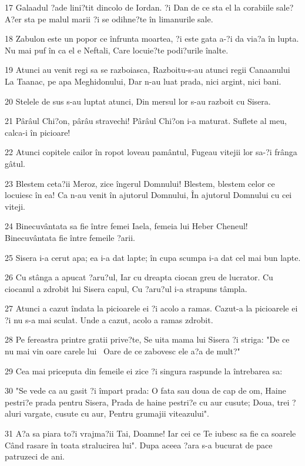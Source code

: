 \par 17 Galaadul ?ade lini?tit dincolo de Iordan. ?i Dan de ce sta el la corabiile sale? A?er sta pe malul marii ?i se odihne?te în limanurile sale.
\par 18 Zabulon este un popor ce înfrunta moartea, ?i este gata a-?i da via?a în lupta. Nu mai puf în ca el e Neftali, Care locuie?te podi?urile înalte.
\par 19 Atunci au venit regi sa se razboiasca, Razboitu-s-au atunci regii Canaanului La Taanac, pe apa Meghidonului, Dar n-au luat prada, nici argint, nici bani.
\par 20 Stelele de sus s-au luptat atunci, Din mersul lor s-au razboit cu Sisera.
\par 21 Pârâul Chi?on, pârâu stravechi! Pârâul Chi?on i-a maturat. Suflete al meu, calca-i în picioare!
\par 22 Atunci copitele cailor în ropot loveau pamântul, Fugeau vitejii lor sa-?i frânga gâtul.
\par 23 Blestem ceta?ii Meroz, zice îngerul Domnului! Blestem, blestem celor ce locuiesc în ea! Ca n-au venit în ajutorul Domnului, În ajutorul Domnului cu cei viteji.
\par 24 Binecuvântata sa fie între femei Iaela, femeia lui Heber Cheneul! Binecuvântata fie între femeile ?arii.
\par 25 Sisera i-a cerut apa; ea i-a dat lapte; în cupa scumpa i-a dat cel mai bun lapte.
\par 26 Cu stânga a apucat ?aru?ul, Iar cu dreapta ciocan greu de lucrator. Cu ciocanul a zdrobit lui Sisera capul, Cu ?aru?ul i-a strapuns tâmpla.
\par 27 Atunci a cazut îndata la picioarele ei ?i acolo a ramas. Cazut-a la picioarele ei ?i nu s-a mai sculat. Unde a cazut, acolo a ramas zdrobit.
\par 28 Pe fereastra printre gratii prive?te, Se uita mama lui Sisera ?i striga: "De ce nu mai vin oare carele lui  Oare de ce zabovesc ele a?a de mult?"
\par 29 Cea mai priceputa din femeile ei zice ?i singura raspunde la întrebarea sa:
\par 30 "Se vede ca au gasit ?i împart prada: O fata sau doua de cap de om, Haine pestri?e prada pentru Sisera, Prada de haine pestri?e cu aur cusute; Doua, trei ?aluri vargate, cusute cu aur, Pentru grumajii viteazului".
\par 31 A?a sa piara to?i vrajma?ii Tai, Doamne! Iar cei ce Te iubesc sa fie ca soarele Când rasare în toata stralucirea lui". Dupa aceea ?ara s-a bucurat de pace patruzeci de ani.


